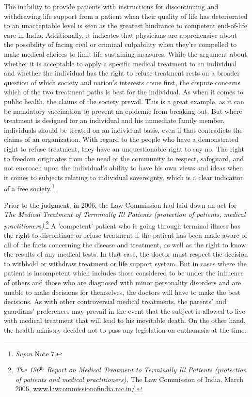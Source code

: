 \begin{multicols}{2}
\noi
The inability to provide patients with instructions for discontinuing and withdrawing life
support from a patient when their quality of life has deteriorated to an unacceptable level is
seen as the greatest hindrance to competent end-of-life care in India. Additionally, it indicates
that physicians are apprehensive about the possibility of facing civil or criminal culpability
when they're compelled to make medical choices to limit life-sustaining measures. While the  
argument about whether it is acceptable to apply a specific medical treatment to an individual
and whether the individual has the right to refuse treatment rests on a broader question of
which society and nation's interests come first, the dispute concerns which of the two
treatment paths is best for the individual. As when it comes to public health, the claims of the
society prevail. This is a great example, as it can be mandatory vaccination to prevent an
epidemic from breaking out. But where treatment is designed for an individual and his
immediate family member, individuals should be treated on an individual basis, even if that
contradicts the claims of an organization. With regard to the people who have a demonstrated
right to refuse treatment, they have an unquestionable right to say no. The right to freedom
originates from the need of the community to respect, safeguard, and not encroach upon the
individual's ability to have his own views and ideas when it comes to subjects relating to
individual sovereignty, which is a clear indication of a free society.\footnote{\textit{Supra} Note 7.}

\vspace{.1cm}

\noi
Prior to the judgment, in 2006, the Law Commission had laid down an act for \textit{The Medical
Treatment of Terminally Ill Patients (protection of patients, medical practitioners)}.\footnote{\textit{The 196$^{\rm th}$ Report on Medical Treatment to Terminally Ill Patients (protection of patients and medical
practitioners),} The Law Commission of India, March 2006, \url{www.lawcommissionofindia.nic.in/.}} A
'competent' patient who is going through terminal illness has the right to discontinue or refuse
treatment if the patient has been made aware of all of the facts concerning the disease and
treatment, as well as the right to know the results of any medical tests. In that case, the doctor
must respect the decision to withhold or withdraw treatment or life support system. But in
cases where the patient is incompetent which includes those considered to be under the
influence of others and those who are diagnosed with minor personality disorders and are
unable to make decisions for themselves, the doctors will have to make the best decisions. As
with other controversial medical treatments, the parents' and guardians' preferences may
prevail in the event that the subject is allowed to live with medical treatment that will lead to
his inevitable death. On the other hand, the health ministry decided not to pass any legislation
on euthanasia at the time.


\end{multicols}
